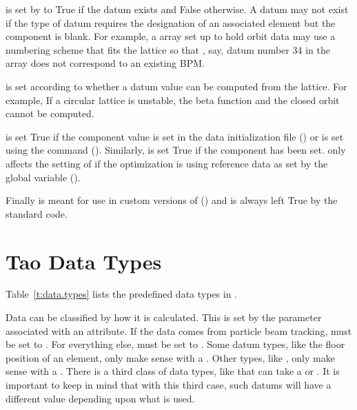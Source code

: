  is set by \tao to True if the datum exists and False
otherwise. A datum may not exist if the type of datum requires the
designation of an associated element but the  component
is blank. For example, a  array set up to hold orbit data
may use a numbering scheme that fits the lattice so that , say, datum
number 34 in the array does not correspond to an existing BPM.

 is set according to whether a datum value can be
computed from the  lattice. For example, If a circular
lattice is unstable, the beta function and the closed orbit cannot be
computed.

 is set True if the  component value is set in
the data initialization file () or is set using the
 command (). Similarly,  is set True
if the  component has been set.  only affects the
setting of  if the optimization is using reference data
as set by the global variable  ().

Finally  is meant for use in custom versions of \tao
() and is always left True by the standard \tao code.

\section{Tao Data Types}
\label{s:data.types}

Table~\ref{t:data.types} lists the predefined data types in \tao. 

Data can be classified by how it is calculated. This is set by the
 parameter associated with an attribute. If the data
comes from particle beam tracking,  must be set to
. For everything else,  must be set to
. Some datum types, like the floor position of an element,
only make sense with a  . Other types, like
, only make sense with a  . There
is a third class of data types, like  that can take a
 or  . It is important to keep
in mind that with this third case, such datums will have a different
value depending upon what  is used.

